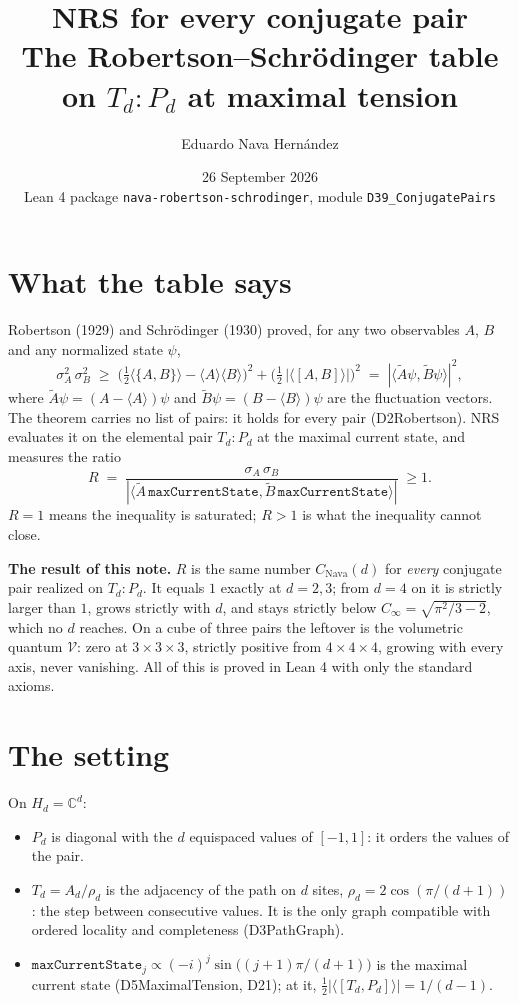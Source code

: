 \documentclass[11pt,a4paper]{article}
\title{NRS for every conjugate pair\\[0.3em]
\large The Robertson--Schrödinger table on $T_d{:}P_d$ at maximal tension}
\author{Eduardo Nava Hernández}
\date{26 September 2026 \\ \small Lean 4 package \texttt{nava-robertson-schrodinger}, module \texttt{D39\_ConjugatePairs}}
\newcommand{\leanus}{\textunderscore\allowbreak}
\newcommand{\lean}[1]{{\small\ttfamily\let\_\leanus #1}}
\begin{document}
\maketitle

\section{What the table says}

Robertson (1929) and Schrödinger (1930) proved, for any two observables $A$, $B$ and any
normalized state $\psi$,
\[
  \sigma_A^2\,\sigma_B^2 \;\ge\; \Big(\tfrac12\langle\{A,B\}\rangle-\langle A\rangle\langle B\rangle\Big)^2
  + \Big(\tfrac12\,|\langle[A,B]\rangle|\Big)^2 \;=\; |\langle \tilde A\psi,\tilde B\psi\rangle|^2 ,
\]
where $\tilde A\psi=(A-\langle A\rangle)\psi$ and $\tilde B\psi=(B-\langle B\rangle)\psi$ are the
fluctuation vectors. The theorem carries no list of pairs: it holds for every pair
(\lean{D2\_Robertson}). NRS evaluates it on the elemental pair $T_d{:}P_d$ at the maximal
current state, and measures the ratio
\[
  R \;=\; \frac{\sigma_A\,\sigma_B}{|\langle \tilde A\,\mathtt{maxCurrentState},\tilde B\,\mathtt{maxCurrentState}\rangle|}\;\ge 1 .
\]
$R=1$ means the inequality is saturated; $R>1$ is what the inequality cannot close.

\textbf{The result of this note.} $R$ is the same number $C_{\mathrm{Nava}}(d)$ for
\emph{every} conjugate pair realized on $T_d{:}P_d$. It equals $1$ exactly at $d=2,3$; from
$d=4$ on it is strictly larger than $1$, grows strictly with $d$, and stays strictly below
$C_\infty=\sqrt{\pi^2/3-2}$, which no $d$ reaches. On a cube of three pairs the leftover is
the volumetric quantum $\mathcal V$: zero at $3\times3\times3$, strictly positive from
$4\times4\times4$, growing with every axis, never vanishing. All of this is proved in Lean 4
with only the standard axioms.

\section{The setting}

On $H_d=\mathbb C^d$:
\begin{itemize}
  \item $P_d$ is diagonal with the $d$ equispaced values of $[-1,1]$: it orders the values of
        the pair.
  \item $T_d=A_d/\rho_d$ is the adjacency of the path on $d$ sites, $\rho_d=2\cos(\pi/(d+1))$:
        the step between consecutive values. It is the only graph compatible with ordered
        locality and completeness (\lean{D3\_PathGraph}).
  \item $\mathtt{maxCurrentState}_j\propto(-i)^j\sin\big((j+1)\pi/(d+1)\big)$ is the maximal current state
        (\lean{D5\_MaximalTension}, \lean{D21}); at it,
        $\tfrac12|\langle[T_d,P_d]\rangle| = 1/(d-1)$.
\end{itemize}
\end{document}
